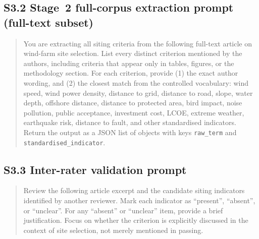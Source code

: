 \documentclass[12pt,a4paper]{article}
\begin{document}
\subsection*{S3.2 Stage~2 full-corpus extraction prompt (full-text subset)}

\begin{quote}
\small
You are extracting all siting criteria from the following full-text article on wind-farm site selection. List every distinct criterion mentioned by the authors, including criteria that appear only in tables, figures, or the methodology section. For each criterion, provide (1) the exact author wording, and (2) the closest match from the controlled vocabulary: wind speed, wind power density, distance to grid, distance to road, slope, water depth, offshore distance, distance to protected area, bird impact, noise pollution, public acceptance, investment cost, LCOE, extreme weather, earthquake risk, distance to fault, and other standardised indicators. Return the output as a JSON list of objects with keys \texttt{raw\_term} and \texttt{standardised\_indicator}.
\end{quote}

\subsection*{S3.3 Inter-rater validation prompt}

\begin{quote}
\small
Review the following article excerpt and the candidate siting indicators identified by another reviewer. Mark each indicator as ``present'', ``absent'', or ``unclear''. For any ``absent'' or ``unclear'' item, provide a brief justification. Focus on whether the criterion is explicitly discussed in the context of site selection, not merely mentioned in passing.
\end{quote}
\end{document}
